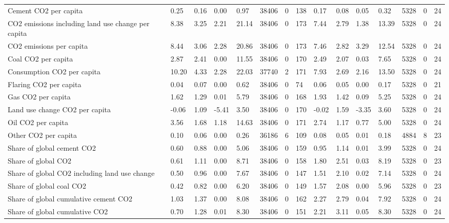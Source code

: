 \begin{longtable}{lllllllllllllll}
\addlinespace
Cement CO2 per capita & 0.25 & 0.16 & 0.00 & 0.97 & 38406 & 0 & 138 & 0.17 & 0.08 & 0.05 & 0.32 & 5328 & 0 & 24\\
CO2 emissions including land use change per capita & 8.38 & 3.25 & 2.21 & 21.14 & 38406 & 0 & 173 & 7.44 & 2.79 & 1.38 & 13.39 & 5328 & 0 & 24\\
CO2 emissions per capita & 8.44 & 3.06 & 2.28 & 20.86 & 38406 & 0 & 173 & 7.46 & 2.82 & 3.29 & 12.54 & 5328 & 0 & 24\\
Coal CO2 per capita & 2.87 & 2.41 & 0.00 & 11.55 & 38406 & 0 & 170 & 2.49 & 2.07 & 0.03 & 7.65 & 5328 & 0 & 24\\
Consumption CO2 per capita & 10.20 & 4.33 & 2.28 & 22.03 & 37740 & 2 & 171 & 7.93 & 2.69 & 2.16 & 13.50 & 5328 & 0 & 24\\
\addlinespace
Flaring CO2 per capita & 0.04 & 0.07 & 0.00 & 0.62 & 38406 & 0 & 74 & 0.06 & 0.05 & 0.00 & 0.17 & 5328 & 0 & 21\\
Gas CO2 per capita & 1.62 & 1.29 & 0.01 & 5.79 & 38406 & 0 & 168 & 1.93 & 1.42 & 0.09 & 5.25 & 5328 & 0 & 24\\
Land use change CO2 per capita & -0.06 & 1.09 & -5.41 & 3.50 & 38406 & 0 & 170 & -0.02 & 1.59 & -3.35 & 3.60 & 5328 & 0 & 24\\
Oil CO2 per capita & 3.56 & 1.68 & 1.18 & 14.63 & 38406 & 0 & 171 & 2.74 & 1.17 & 0.77 & 5.00 & 5328 & 0 & 24\\
Other CO2 per capita & 0.10 & 0.06 & 0.00 & 0.26 & 36186 & 6 & 109 & 0.08 & 0.05 & 0.01 & 0.18 & 4884 & 8 & 23\\
\addlinespace
Share of global cement CO2 & 0.60 & 0.88 & 0.00 & 5.06 & 38406 & 0 & 159 & 0.95 & 1.14 & 0.01 & 3.99 & 5328 & 0 & 24\\
Share of global CO2 & 0.61 & 1.11 & 0.00 & 8.71 & 38406 & 0 & 158 & 1.80 & 2.51 & 0.03 & 8.19 & 5328 & 0 & 23\\
Share of global CO2 including land use change & 0.50 & 0.96 & 0.00 & 7.67 & 38406 & 0 & 147 & 1.51 & 2.10 & 0.02 & 7.14 & 5328 & 0 & 24\\
Share of global coal CO2 & 0.42 & 0.82 & 0.00 & 6.20 & 38406 & 0 & 149 & 1.57 & 2.08 & 0.00 & 5.96 & 5328 & 0 & 23\\
Share of global cumulative cement CO2 & 1.03 & 1.37 & 0.00 & 8.08 & 38406 & 0 & 162 & 2.27 & 2.79 & 0.04 & 7.92 & 5328 & 0 & 24\\
\addlinespace
Share of global cumulative CO2 & 0.70 & 1.28 & 0.01 & 8.30 & 38406 & 0 & 151 & 2.21 & 3.11 & 0.05 & 8.30 & 5328 & 0 & 24\\

\end{longtable}
